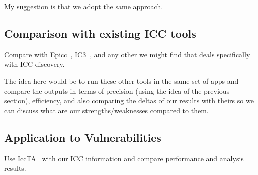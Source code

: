 My suggestion is that we adopt the same approach. 

\subsection{Comparison with existing ICC tools}

Compare with Epicc~\cite{epicc}, IC3~\cite{ic3-icse15}, and any other we might find that deals specifically with ICC discovery. 

The idea here would be to run these other tools in the same set of apps and compare the outputs in terms of precision (using the idea of the previous section), efficiency, and also comparing the deltas of our results with theirs so we can discuss what are our strengths/weaknesses compared to them. 

\subsection{Application to Vulnerabilities}

Use IccTA~\cite{iccta} with our ICC information and compare performance and analysis results. 
